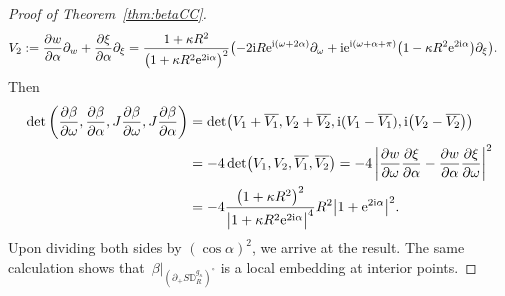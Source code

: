 \documentclass[10pt,a4paper]{amsart}
\numberwithin{equation}{section}
\theoremstyle{definition}
\newcommand{\1}{{\bf 1}}
\newcommand \Dm { \mathbb{D}}
\begin{document}
\begin{proof}[Proof of Theorem~\ref{thm:betaCC}]
\begin{align*}
		&V_2:= \frac{\partial w}{\partial\alpha}\partial_w + \frac{\partial\xi}{\partial\alpha} \partial_\xi = \frac{1+\kappa R^2}{\bigl(1+\kappa R^2 {\rm e}^{2{\rm i}\alpha}\bigr)^2} \bigl(-2{\rm i}R {\rm e}^{{\rm i}(\omega+2\alpha)} \partial_\omega + {\rm i} {\rm e}^{{\rm i}(\omega + \alpha+\pi)} \bigl(1-\kappa R^2 {\rm e}^{2{\rm i}\alpha}\bigr) \partial_\xi \bigr).
	\end{align*}
	Then
	\begin{align*}
		\det \left(\frac{\partial\beta}{\partial\omega}, \frac{\partial\beta}{\partial\alpha}, J \frac{\partial\beta}{\partial\omega}, J\frac{\partial\beta}{\partial\alpha}\right) &= \det \bigl(V_1 + \overline{V_1}, V_2 + \overline{V_2}, {\rm i} (V_1-\overline{V_1}), {\rm i} \bigl(V_2-\overline{V_2}\bigr)\bigr) \\
		&= -4 \det \bigl(V_1, V_2, \overline{V_1}, \overline{V_2}\bigr) = -4 \left| \frac{\partial w}{\partial\omega}\frac{\partial\xi}{\partial\alpha} - \frac{\partial w}{\partial\alpha} \frac{\partial\xi}{\partial\omega} \right|^2 \\
		&= -4 \frac{\bigl(1+\kappa R^2\bigr)^2}{\big|1+\kappa R^2 {\rm e}^{2{\rm i}\alpha}\big|^4} R^2 \big|1+{\rm e}^{2{\rm i}\alpha}\big|^2.
	\end{align*}
	Upon dividing both sides by $(\cos\alpha)^2$, we arrive at the result. The same calculation shows that~$\beta|_{(\partial_+ S\Dm_R^{g_\kappa})^\circ}$ is a local embedding at interior points.



\end{proof}
\end{document}
